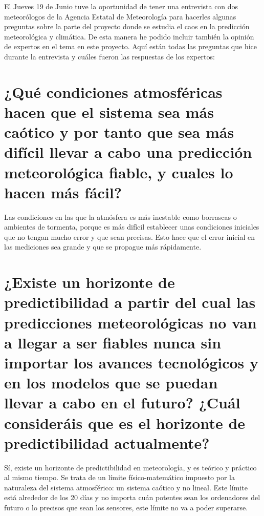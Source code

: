 \documentclass[
  10pt,
  a4paper,
  DIV=11,
  numbers=noendperiod,
  open=any]{scrreprt}
\numberwithin{equation}{chapter}
\numberwithin{equation}{section}
\renewcommand{\[}{\begin{equation}}
\renewcommand{\]}{\end{equation}}
\begin{document}
El Jueves 19 de Junio tuve la oportunidad de tener una entrevista con
dos meteorólogos de la Agencia Estatal de Meteorología para hacerles
algunas preguntas sobre la parte del proyecto donde se estudia el caos
en la predicción meteorológica y climática. De esta manera he podido
incluir también la opinión de expertos en el tema en este proyecto. Aquí
están todas las preguntas que hice durante la entrevista y cuáles fueron
las respuestas de los expertos:

\section{¿Qué condiciones atmosféricas hacen que el sistema sea más
caótico y por tanto que sea más difícil llevar a cabo una predicción
meteorológica fiable, y cuales lo hacen más
fácil?}\label{quuxe9-condiciones-atmosfuxe9ricas-hacen-que-el-sistema-sea-muxe1s-cauxf3tico-y-por-tanto-que-sea-muxe1s-difuxedcil-llevar-a-cabo-una-predicciuxf3n-meteoroluxf3gica-fiable-y-cuales-lo-hacen-muxe1s-fuxe1cil}

Las condiciones en las que la atmósfera es más inestable como borrascas
o ambientes de tormenta, porque es más difícil establecer unas
condiciones iniciales que no tengan mucho error y que sean precisas.
Esto hace que el error inicial en las mediciones sea grande y que se
propague más rápidamente.

\section{¿Existe un horizonte de predictibilidad a partir del cual las
predicciones meteorológicas no van a llegar a ser fiables nunca sin
importar los avances tecnológicos y en los modelos que se puedan llevar
a cabo en el futuro? ¿Cuál consideráis que es el horizonte de
predictibilidad
actualmente?}\label{existe-un-horizonte-de-predictibilidad-a-partir-del-cual-las-predicciones-meteoroluxf3gicas-no-van-a-llegar-a-ser-fiables-nunca-sin-importar-los-avances-tecnoluxf3gicos-y-en-los-modelos-que-se-puedan-llevar-a-cabo-en-el-futuro-cuuxe1l-consideruxe1is-que-es-el-horizonte-de-predictibilidad-actualmente}

Sí, existe un horizonte de predictibilidad en meteorología, y es teórico
y práctico al mismo tiempo. Se trata de un límite físico-matemático
impuesto por la naturaleza del sistema atmosférico: un sistema caótico y
no lineal. Este límite está alrededor de los 20 días y no importa cuán
potentes sean los ordenadores del futuro o lo precisos que sean los
sensores, este límite no va a poder superarse.
\end{document}

